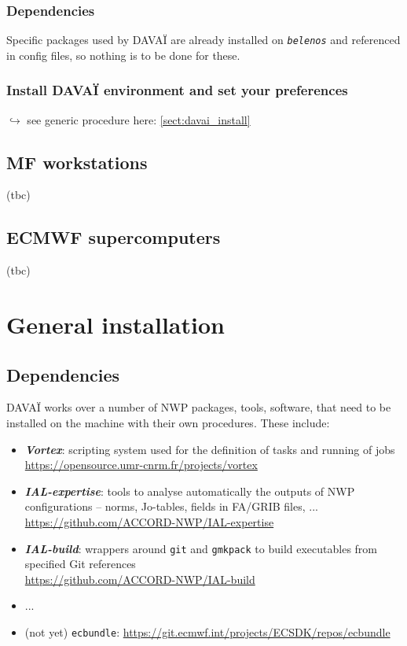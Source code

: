 \documentclass[a4paper,10pt,twoside]{article}
\begin{document}
\subsubsection{Dependencies}
Specific packages used by DAVAÏ are already installed on \textit{\texttt{belenos}} and referenced in config files, so nothing is to be done for these.

\subsubsection{Install DAVAÏ environment and set your preferences}

$\hookrightarrow$ see generic procedure here: \ref{sect:davai_install}

\subsection{MF workstations}
(tbc)

\subsection{ECMWF supercomputers}
(tbc)






\newpage
\section{General installation}
\subsection{Dependencies}

DAVAÏ works over a number of NWP packages, tools, software, that need to be installed on the machine with their own procedures.
These include:
\begin{itemize}
 \item \textit{\textbf{Vortex}}: scripting system used for the definition of tasks and running of jobs\\
 \href{https://opensource.umr-cnrm.fr/projects/vortex}{https://opensource.umr-cnrm.fr/projects/vortex}
 \item \textit{\textbf{IAL-expertise}}: tools to analyse automatically the outputs of NWP configurations -- norms, Jo-tables, fields in FA/GRIB files, ...\\
 \href{https://github.com/ACCORD-NWP/IAL-expertise}{https://github.com/ACCORD-NWP/IAL-expertise}
 \item \textit{\textbf{IAL-build}}: wrappers around \texttt{git} and \texttt{gmkpack} to build executables from specified Git references\\
 \href{https://github.com/ACCORD-NWP/IAL-build}{https://github.com/ACCORD-NWP/IAL-build}
 \item ...
 \item (not yet) \texttt{ecbundle}: \href{https://git.ecmwf.int/projects/ECSDK/repos/ecbundle}{https://git.ecmwf.int/projects/ECSDK/repos/ecbundle}
\end{itemize}
\end{document}
